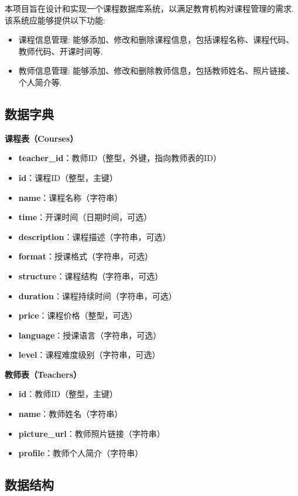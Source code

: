 \documentclass[12pt, oneside]{ctexart}
\numberwithin{figure}{section}
\numberwithin{table}{section}
\begin{document}
本项目旨在设计和实现一个课程数据库系统，以满足教育机构对课程管理的需求. 该系统应能够提供以下功能:
\begin{itemize}
    \item 课程信息管理: 能够添加、修改和删除课程信息，包括课程名称、课程代码、教师代码、开课时间等.
    \item 教师信息管理: 能够添加、修改和删除教师信息，包括教师姓名、照片链接、个人简介等.
\end{itemize}

\subsection{数据字典}

\textbf{课程表（Courses）}
\begin{itemize}
    \item \textbf{teacher\_id}：教师ID（整型，外键，指向教师表的ID）
    \item \textbf{id}：课程ID（整型，主键）
    \item \textbf{name}：课程名称（字符串）
    \item \textbf{time}：开课时间（日期时间，可选）
    \item \textbf{description}：课程描述（字符串，可选）
    \item \textbf{format}：授课格式（字符串，可选）
    \item \textbf{structure}：课程结构（字符串，可选）
    \item \textbf{duration}：课程持续时间（字符串，可选）
    \item \textbf{price}：课程价格（整型，可选）
    \item \textbf{language}：授课语言（字符串，可选）
    \item \textbf{level}：课程难度级别（字符串，可选）
\end{itemize}

\textbf{教师表（Teachers）}
\begin{itemize}
    \item \textbf{id}：教师ID（整型，主键）
    \item \textbf{name}：教师姓名（字符串）
    \item \textbf{picture\_url}：教师照片链接（字符串）
    \item \textbf{profile}：教师个人简介（字符串）
\end{itemize}

\subsection{数据结构}
\end{document}
